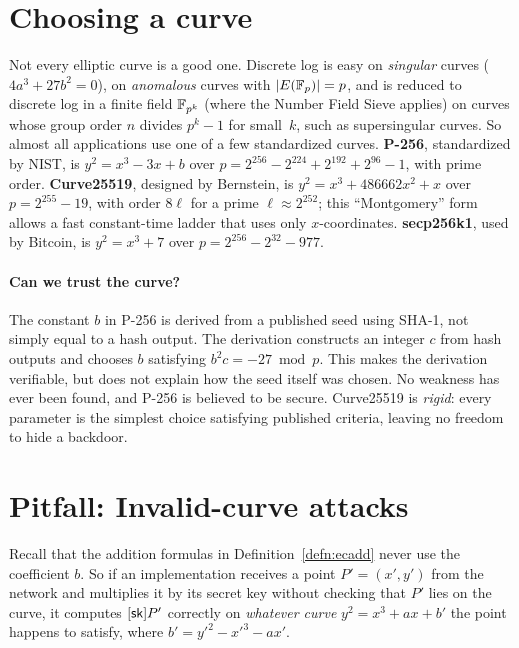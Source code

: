 \section{Choosing a curve}

Not every elliptic curve is a good one. Discrete log is easy on
\emph{singular} curves ($4a^3 + 27b^2 = 0$), on \emph{anomalous} curves
with $|E(\mathbb{F}_p)| = p$,\autocite{Smart99} and is reduced to discrete log in
a finite field $\mathbb{F}_{p^k}$ (where the Number Field Sieve applies) on curves
whose group order $n$ divides $p^k - 1$ for small~$k$, such as
supersingular curves.\autocite{MOV93}
So almost all applications use one of a few standardized curves.
\textbf{P-256}, standardized by NIST, is
$y^2 = x^3 - 3x + b$ over $p = 2^{256} - 2^{224} + 2^{192} + 2^{96} - 1$,
with prime order.
\textbf{Curve25519}, designed by Bernstein,\autocite{Bernstein06} is
$y^2 = x^3 + 486662x^2 + x$ over $p = 2^{255} - 19$, with order $8\ell$
for a prime $\ell \approx 2^{252}$; this ``Montgomery'' form allows a fast
constant-time ladder that uses only $x$-coordinates.
\textbf{secp256k1}, used by Bitcoin, is $y^2 = x^3 + 7$ over
$p = 2^{256} - 2^{32} - 977$.

\paragraph{Can we trust the curve?}
The constant $b$ in P-256 is derived from a published seed using SHA-1,
not simply equal to a hash output. The derivation constructs an integer
$c$ from hash outputs and chooses $b$ satisfying $b^2c = -27 \bmod p$.
This makes the derivation verifiable, but does not explain how the seed
itself was chosen.
No weakness has ever been found, and P-256 is believed to be secure.
Curve25519 is \emph{rigid}: every parameter is the simplest choice
satisfying published criteria, leaving no freedom to hide a backdoor.

\section{Pitfall: Invalid-curve attacks}
\label{sec:invalid-curve}

Recall that the addition formulas in Definition~\ref{defn:ecadd} never use the
coefficient $b$.
So if an implementation receives a point $P' = (x', y')$ from the network
and multiplies it by its secret key without checking that $P'$ lies on
the curve, it computes $[{\mathsf{sk}}]P'$ correctly on \emph{whatever curve}
$y^2 = x^3 + ax + b'$ the point happens to satisfy, where
$b' = y'^2 - x'^3 - ax'$.

